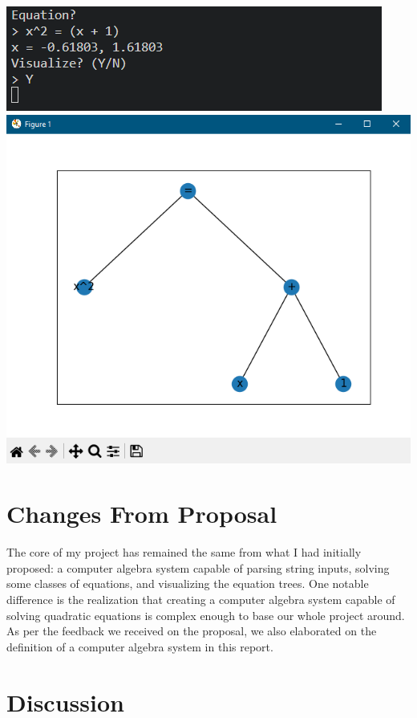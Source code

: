 \documentclass[11pt]{article}
\begin{document}
\begin{center}
\includegraphics[scale=0.65]{ex1.png}
\includegraphics[scale=0.5]{ex2.png}
\end{center}

\section*{Changes From Proposal}

The core of my project has remained the same from what I had initially proposed: a computer algebra system capable of parsing string inputs, solving some classes of equations, and visualizing the equation trees. One notable difference is the realization that creating a computer algebra system capable of solving quadratic equations is complex enough to base our whole project around. As per the feedback we received on the proposal, we also elaborated on the definition of a computer algebra system in this report.

\section*{Discussion}
\end{document}
